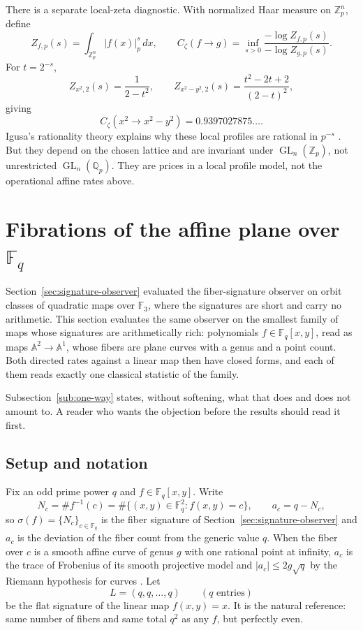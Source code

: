 \documentclass[11pt]{article}
\theoremstyle{definition}
\theoremstyle{plain}
\theoremstyle{remark}
\newcommand{\F}{\mathbb F}
\newcommand{\GL}{\operatorname{GL}}
\begin{document}
There is a separate local-zeta diagnostic.  With normalized Haar measure on
\(\mathbb Z_p^n\), define
\[
  Z_{f,p}(s)=\int_{\mathbb Z_p^n}|f(x)|_p^s\,dx,
  \qquad
  C_\zeta(f\to g)
  =\inf_{s>0}\frac{-\log Z_{f,p}(s)}{-\log Z_{g,p}(s)}.
\]
For \(t=2^{-s}\),
\[
  Z_{x^2,2}(s)=\frac1{2-t^2},
  \qquad
  Z_{x^2-y^2,2}(s)=\frac{t^2-2t+2}{(2-t)^2},
\]
giving
\[
  C_\zeta(x^2\to x^2-y^2)=0.9397027875\ldots.
\]
Igusa's rationality theory explains why these local profiles are rational in
\(p^{-s}\) \cite{igusa-zeta}.  But they depend on the chosen lattice and are
invariant under \(\GL_n(\mathbb Z_p)\), not unrestricted
\(\GL_n(\mathbb Q_p)\).  They are prices in a local profile model, not the
operational affine rates above.

\section{Fibrations of the affine plane over \texorpdfstring{\(\F_q\)}{Fq}}
\label{sec:frobenius}

Section~\ref{sec:signature-observer} evaluated the fiber-signature observer on
orbit classes of quadratic maps over \(\F_3\), where the signatures are short
and carry no arithmetic.  This section evaluates the same observer on the
smallest family of maps whose signatures are arithmetically rich: polynomials
\(f\in\F_q[x,y]\), read as maps \(\mathbb A^2\to\mathbb A^1\), whose fibers are
plane curves with a genus and a point count.  Both directed rates against a
linear map then have closed forms, and each of them reads exactly one classical
statistic of the family.

Subsection~\ref{sub:one-way} states, without softening, what that does and does
not amount to.  A reader who wants the objection before the results should read
it first.

\subsection{Setup and notation}
\label{sub:frobenius-setup}

Fix an odd prime power \(q\) and \(f\in\F_q[x,y]\).  Write
\[
  N_c=\#f^{-1}(c)=\#\{(x,y)\in\F_q^2: f(x,y)=c\},
  \qquad
  a_c=q-N_c ,
\]
so \(\sigma(f)=\{N_c\}_{c\in\F_q}\) is the fiber signature of
Section~\ref{sec:signature-observer} and \(a_c\) is the deviation of the fiber
count from the generic value \(q\).  When the fiber over \(c\) is a smooth
affine curve of genus \(g\) with one rational point at infinity, \(a_c\) is
the trace of Frobenius of its smooth projective model and
\(|a_c|\le 2g\sqrt q\) by the Riemann hypothesis for curves
\cite{weil-courbes}.  Let
\[
  L=(q,q,\ldots,q)\qquad(q\text{ entries})
\]
be the flat signature of the linear map \(f(x,y)=x\).  It is the natural
reference: same number of fibers and same total \(q^2\) as any \(f\), but
perfectly even.
\end{document}
